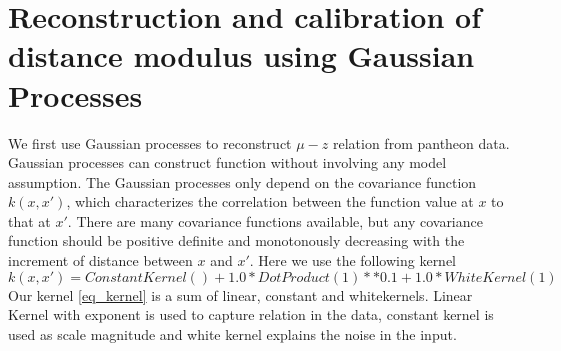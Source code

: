 \section{Reconstruction and calibration of distance modulus using Gaussian Processes}
We first use Gaussian processes to  reconstruct $\mu-z$ relation from pantheon data. Gaussian processes can construct function without involving any model assumption. The Gaussian processes only depend on the covariance function $k(x, x')$, which characterizes the correlation between the function value at $x$ to that at $x'$. There are many covariance functions available, but any covariance function should be positive definite and monotonously decreasing with the increment of distance between $x$ and $x'$. Here we use the following kernel
\begin{equation}\label{eq_kernel}
	k(x, x') = ConstantKernel() + 1.0 * DotProduct(1) ** 0.1 + 1.0 * WhiteKernel(1)
\end{equation}
Our kernel \eqref{eq_kernel} is a sum of linear, constant and whitekernels. Linear Kernel with exponent is used to capture relation in the data, constant kernel is used as scale magnitude and white kernel explains the noise in the input.



